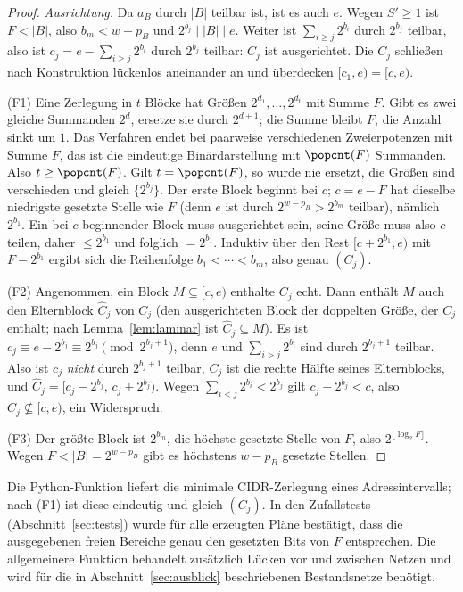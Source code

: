 \begin{proof}
	\emph{Ausrichtung.} Da $a_B$ durch $|B|$ teilbar ist, ist es auch $e$. Wegen $S' \ge 1$ ist $F < |B|$, also $b_m < w-p_B$ und $2^{b_j} \mid |B| \mid e$. Weiter ist $\sum_{i\ge j} 2^{b_i}$ durch $2^{b_j}$ teilbar, also ist $c_j = e - \sum_{i\ge j}2^{b_i}$ durch $2^{b_j}$ teilbar: $C_j$ ist ausgerichtet. Die $C_j$ schließen nach Konstruktion lückenlos aneinander an und überdecken $[c_1, e) = [c,e)$.

	(F1) Eine Zerlegung in $t$ Blöcke hat Größen $2^{d_1},\ldots,2^{d_t}$ mit Summe $F$. Gibt es zwei gleiche Summanden $2^d$, ersetze sie durch $2^{d+1}$; die Summe bleibt $F$, die Anzahl sinkt um $1$. Das Verfahren endet bei paarweise verschiedenen Zweierpotenzen mit Summe $F$, das ist die eindeutige Binärdarstellung mit $\popcnt(F)$ Summanden. Also $t \ge \popcnt(F)$. Gilt $t = \popcnt(F)$, so wurde nie ersetzt, die Größen sind verschieden und gleich $\{2^{b_j}\}$. Der erste Block beginnt bei $c$; $c = e - F$ hat dieselbe niedrigste gesetzte Stelle wie $F$ (denn $e$ ist durch $2^{w-p_B} > 2^{b_m}$ teilbar), nämlich $2^{b_1}$. Ein bei $c$ beginnender Block muss ausgerichtet sein, seine Größe muss also $c$ teilen, daher $\le 2^{b_1}$ und folglich $= 2^{b_1}$. Induktiv über den Rest $[c + 2^{b_1}, e)$ mit $F - 2^{b_1}$ ergibt sich die Reihenfolge $b_1<\cdots<b_m$, also genau $(C_j)$.

	(F2) Angenommen, ein Block $M \subseteq [c,e)$ enthalte $C_j$ echt. Dann enthält $M$ auch den Elternblock $\hat C_j$ von $C_j$ (den ausgerichteten Block der doppelten Größe, der $C_j$ enthält; nach Lemma~\ref{lem:laminar} ist $\hat C_j \subseteq M$). Es ist $c_j \equiv e - 2^{b_j} \equiv 2^{b_j} \pmod{2^{b_j+1}}$, denn $e$ und $\sum_{i>j}2^{b_i}$ sind durch $2^{b_j+1}$ teilbar. Also ist $c_j$ \emph{nicht} durch $2^{b_j+1}$ teilbar, $C_j$ ist die rechte Hälfte seines Elternblocks, und $\hat C_j = [c_j - 2^{b_j},\, c_j + 2^{b_j})$. Wegen $\sum_{i<j}2^{b_i} < 2^{b_j}$ gilt $c_j - 2^{b_j} < c$, also $\hat C_j \not\subseteq [c,e)$, ein Widerspruch.

	(F3) Der größte Block ist $2^{b_m}$, die höchste gesetzte Stelle von $F$, also $2^{\lfloor\log_2 F\rfloor}$. Wegen $F < |B| = 2^{w-p_B}$ gibt es höchstens $w - p_B$ gesetzte Stellen.
\end{proof}

\begin{bemerkung}
	Die Python-Funktion  liefert die minimale CIDR-Zerlegung eines Adressintervalls; nach (F1) ist diese eindeutig und gleich $(C_j)$. In den Zufallstests (Abschnitt~\ref{sec:tests}) wurde für alle erzeugten Pläne bestätigt, dass die ausgegebenen freien Bereiche genau den gesetzten Bits von $F$ entsprechen. Die allgemeinere Funktion  behandelt zusätzlich Lücken vor und zwischen Netzen und wird für die in Abschnitt~\ref{sec:ausblick} beschriebenen Bestandsnetze benötigt.
\end{bemerkung}


